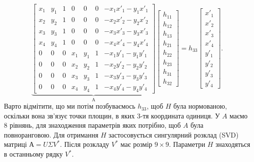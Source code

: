 \begin{equation*}
    \underbrace{
        \begin{bmatrix}
            x_1 & y_1 & 1 & 0   & 0   & 0 & -x_1x'_1 -y_1x'_1 \\
            x_2 & y_2 & 1 & 0   & 0   & 0 & -x_2x'_2 -y_2x'_2 \\
            x_3 & y_3 & 1 & 0   & 0   & 0 & -x_3x'_3 -y_3x'_3 \\
            x_4 & y_4 & 1 & 0   & 0   & 0 & -x_4x'_4 -y_4x'_4 \\
            0   & 0   & 0 & x_1 & y_1 & 1 & -x_1y'_1 -y_1y'_1 \\
            0   & 0   & 0 & x_2 & y_2 & 1 & -x_2y'_2 -y_2y'_2 \\
            0   & 0   & 0 & x_3 & y_3 & 1 & -x_3y'_3 -y_3y'_3 \\
            0   & 0   & 0 & x_4 & y_4 & 1 & -x_4y'_4 -y_4y'_4
        \end{bmatrix}
    }_\textrm{A}
    \begin{bmatrix}
        h_{11} \\
        h_{12} \\
        h_{13} \\
        h_{21} \\
        h_{22} \\
        h_{23} \\
        h_{31} \\
        h_{32}
    \end{bmatrix}
    =
    h_{33}
    \begin{bmatrix}
        x'_1 \\
        x'_2 \\
        x'_3 \\
        x'_4 \\
        y'_1 \\
        y'_2 \\
        y'_3 \\
        y'_4
    \end{bmatrix}.
\end{equation*}
Варто відмітити, що ми потім позбуваємось $h_{33}$, щоб $H$ була нормованою, оскільки вона
зв'язує точки площин, в яких 3-тя координата одиниця.
У $A$ маємо 8 рівнянь, для знаходження параметрів яких потрібно, щоб $A$ була повноранговою.
Для отримання $H$ застосовується сингулярний розклад (SVD) матриці $А = U\Sigma V^*$.
Після розкладу $V^*$ має розмір $9\times9$. Параметри $H$ знаходяться в останньому рядку $V^*$.

